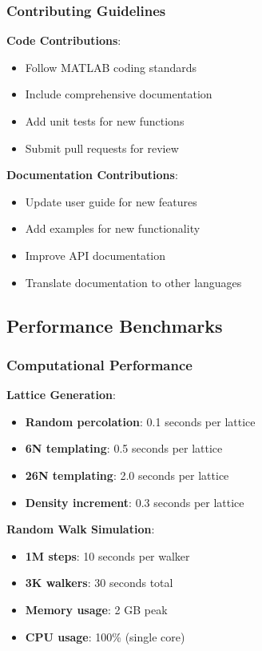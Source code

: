 \subsubsection{Contributing Guidelines}
\textbf{Code Contributions}:
\begin{itemize}
    \item Follow MATLAB coding standards
    \item Include comprehensive documentation
    \item Add unit tests for new functions
    \item Submit pull requests for review
\end{itemize}

\textbf{Documentation Contributions}:
\begin{itemize}
    \item Update user guide for new features
    \item Add examples for new functionality
    \item Improve API documentation
    \item Translate documentation to other languages
\end{itemize}

\subsection{Performance Benchmarks}

\subsubsection{Computational Performance}
\textbf{Lattice Generation}:
\begin{itemize}
    \item \textbf{Random percolation}: 0.1 seconds per lattice
    \item \textbf{6N templating}: 0.5 seconds per lattice
    \item \textbf{26N templating}: 2.0 seconds per lattice
    \item \textbf{Density increment}: 0.3 seconds per lattice
\end{itemize}

\textbf{Random Walk Simulation}:
\begin{itemize}
    \item \textbf{1M steps}: 10 seconds per walker
    \item \textbf{3K walkers}: 30 seconds total
    \item \textbf{Memory usage}: 2 GB peak
    \item \textbf{CPU usage}: 100\% (single core)
\end{itemize}

